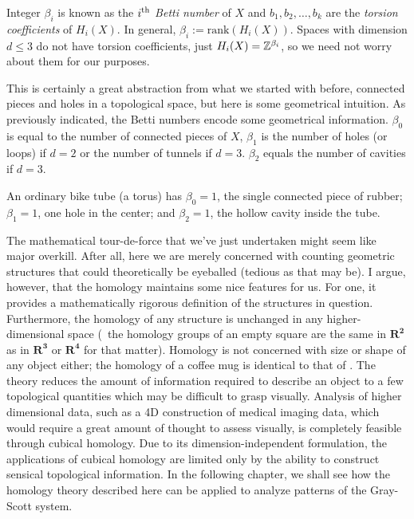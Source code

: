 Integer $\beta_i$ is known as the $i\textsuperscript{th}$ \textit{Betti number} of $X$ and $b_1, b_2, \ldots, b_k$ are the \textit{torsion coefficients} of $H_i(X)$. In general, $\beta_i := \text{rank}( H_i( X ) )$. Spaces with dimension $d \leq 3$ do not have torsion coefficients, just $H_i(X) = \mathbb{Z}^{\beta_i}$, so we need not worry about them for our purposes.

This is certainly a great abstraction from what we started with before, connected pieces and holes in a topological space, but here is some geometrical intuition. As previously indicated, the Betti numbers encode some geometrical information. $\beta_0$ is equal to the number of connected pieces of $X$, $\beta_1$ is the number of holes (or loops) if $d = 2$ or the number of tunnels if $d = 3$. $\beta_2$ equals the number of cavities if $d=3$.

\begin{exmp}
	An ordinary bike tube (a torus) has $\beta_0 = 1$, the single connected piece of rubber; $\beta_1 = 1$, one hole in the center; and $\beta_2 = 1$, the hollow cavity inside the tube.
\end{exmp}

The mathematical tour-de-force that we've just undertaken might seem like major overkill. After all, here we are merely concerned with counting geometric structures that could theoretically be eyeballed (tedious as that may be). I argue, however, that the homology maintains some nice features for us. For one, it provides a mathematically rigorous definition of the structures in question. Furthermore, the homology of any structure is unchanged in any higher-dimensional space (\eg~the homology groups of an empty square are the same in $\mathbf{R^2}$ as in $\mathbf{R^3}$ or $\mathbf{R^4}$ for that matter). Homology is not concerned with size or shape of any object either; the homology of a coffee mug is identical to that of . The theory reduces the amount of information required to describe an object to a few topological quantities which may be difficult to grasp visually. Analysis of higher dimensional data, such as a 4D construction of medical imaging data, which would require a great amount of thought to assess visually, is completely feasible through cubical homology. Due to its dimension-independent formulation, the applications of cubical homology are limited only by the ability to construct sensical topological information. In the following chapter, we shall see how the homology theory described here can be applied to analyze patterns of the Gray-Scott system.


